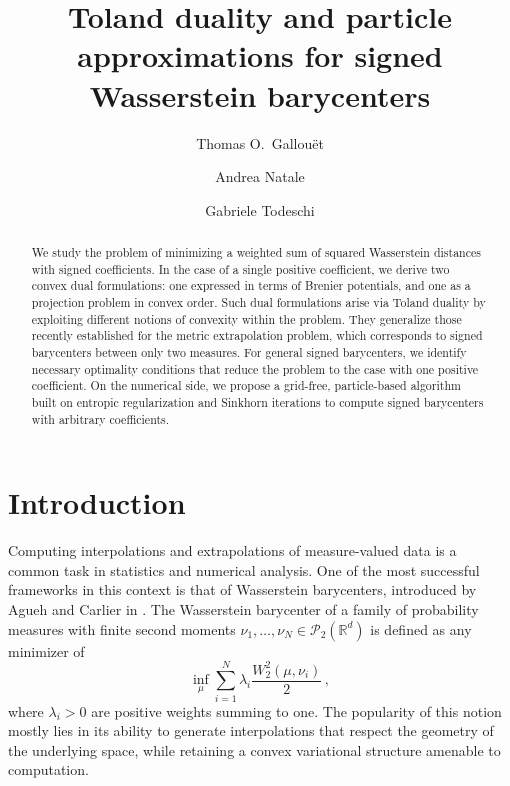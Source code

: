 \documentclass[12pt]{amsart}
\title[Duality and particle approximations for signed Wasserstein barycenters]{Toland duality and particle approximations for signed Wasserstein barycenters}
\author[T.\ O. Gallou\"et]{Thomas O.\ Gallou\"et}
\author[A. Natale]{Andrea Natale}
\author[G. Todeschi]{Gabriele Todeschi}
\numberwithin{equation}{section}
\let\mc=\mathcal
\theoremstyle{plain}
\theoremstyle{definition}
\begin{document}
\maketitle

\begin{abstract}
We study the problem of minimizing a weighted sum of squared Wasserstein distances with signed coefficients. In the case of a single positive coefficient, we derive two convex dual formulations: one expressed in terms of Brenier potentials, and one as a projection problem in convex order. Such dual formulations arise via Toland duality by exploiting different notions of convexity within the problem. They generalize those recently established for the metric extrapolation problem, which corresponds to signed barycenters between only two measures. For general signed barycenters, we identify necessary optimality conditions that reduce the problem to the case with one positive coefficient. On the numerical side, we propose a grid-free, particle-based algorithm built on entropic regularization and Sinkhorn iterations to compute signed barycenters with arbitrary coefficients.
\end{abstract}

\section{Introduction}
Computing interpolations and extrapolations of measure-valued data is a common task in statistics and numerical analysis. One of the most successful frameworks in this context is that of Wasserstein barycenters, introduced by Agueh and Carlier in \cite{agueh2011barycenters}.  The Wasserstein barycenter of a family of probability measures 
 with finite second moments $\nu_1,\ldots, \nu_N\in\mc{P}_2(\mathbb{R}^d)$ is defined as any minimizer of
\begin{equation}\label{eq:signed}
\inf_\mu \sum_{i=1}^N \lambda_i \frac{W^2_2(\mu,\nu_i)}2 \,,
\end{equation}
where $\lambda_i>0$ are positive weights summing to one. The popularity of this notion mostly lies in its ability to generate interpolations that respect the geometry of the underlying space, while retaining a convex variational structure amenable to computation.
\end{document}
